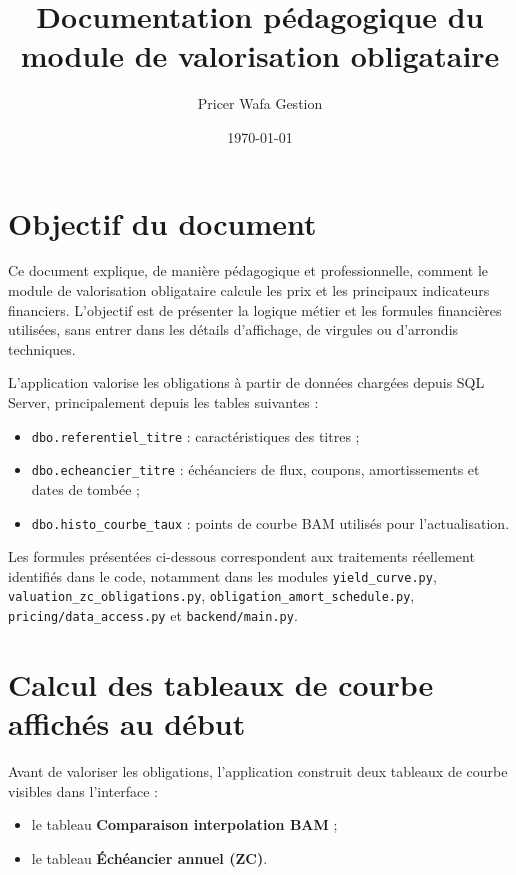 \documentclass[12pt,a4paper]{article}
\title{Documentation pédagogique du module de valorisation obligataire}
\author{Pricer Wafa Gestion}
\date{\today}
\begin{document}
\maketitle

\section*{Objectif du document}

Ce document explique, de manière pédagogique et professionnelle, comment le module de valorisation obligataire calcule les prix et les principaux indicateurs financiers. L'objectif est de présenter la logique métier et les formules financières utilisées, sans entrer dans les détails d'affichage, de virgules ou d'arrondis techniques.

L'application valorise les obligations à partir de données chargées depuis SQL Server, principalement depuis les tables suivantes :

\begin{itemize}
    \item \texttt{dbo.referentiel\_titre} : caractéristiques des titres ;
    \item \texttt{dbo.echeancier\_titre} : échéanciers de flux, coupons, amortissements et dates de tombée ;
    \item \texttt{dbo.histo\_courbe\_taux} : points de courbe BAM utilisés pour l'actualisation.
\end{itemize}

Les formules présentées ci-dessous correspondent aux traitements réellement identifiés dans le code, notamment dans les modules \texttt{yield\_curve.py}, \texttt{valuation\_zc\_obligations.py}, \texttt{obligation\_amort\_schedule.py}, \texttt{pricing/data\_access.py} et \texttt{backend/main.py}.

\section{Calcul des tableaux de courbe affichés au début}

Avant de valoriser les obligations, l'application construit deux tableaux de courbe visibles dans l'interface :

\begin{itemize}
    \item le tableau \textbf{Comparaison interpolation BAM} ;
    \item le tableau \textbf{Échéancier annuel (ZC)}.
\end{itemize}
\end{document}
